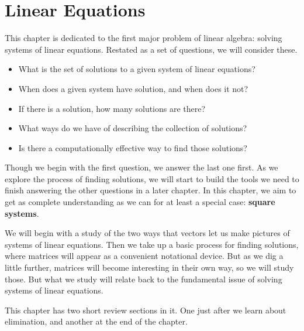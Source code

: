 \documentclass[10pt,]{book}
\newcommand{\terminology}[1]{\textbf{#1}}
\theoremstyle{plain}
\numberwithin{equation}{section}
\begin{document}
\clearpage
\typeout{************************************************}
\typeout{************************************************}
\chapter[Linear Equations]{Linear Equations}\label{chapter-2}

      This chapter is dedicated to the first major problem of
      linear algebra: solving systems of linear equations. Restated as a set of
      questions, we will consider these.
\begin{itemize}
\item{}
        What is the set of solutions to a given system of linear equations?
      \item{}
        When does a given system have solution, and when does it not?
      \item{}
        If there is a solution, how many solutions are there?
      \item{}
        What ways do we have of describing the collection of solutions?
      \item{}
        Is there a computationally effective way to find those solutions?
      \end{itemize}
\par

      Though we begin with the first question, we answer the last one first. As
      we explore the process of finding solutions, we will start to build the
      tools we need to finish answering the other questions in a later chapter.
      In this chapter, we aim to get as complete understanding as we can for at
      least a special case: \terminology{square systems}.
\par

      We will begin with a study of the two ways that vectors let us make pictures
      of systems of linear equations. Then we take up a basic process for finding
      solutions, where matrices will appear as a convenient notational device.
      But as we dig a little further, matrices will become interesting in their
      own way, so we will study those. But what we study will relate back to
      the fundamental issue of solving systems of linear equations.
\par

      This chapter has two short review sections in it. One just after we learn
      about elimination, and another at the end of the chapter.
\typeout{************************************************}
\typeout{************************************************}
\end{document}
